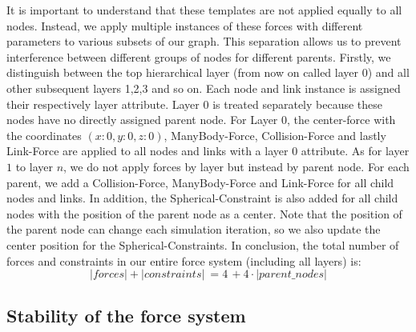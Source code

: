 It is important to understand that these templates are not applied equally to all nodes. Instead, we apply multiple instances of these forces with different parameters to various subsets of our graph. 
This separation allows us to prevent interference between different groups of nodes for different parents.
Firstly, we distinguish between the top hierarchical layer (from now on called layer $0$) and all other subsequent layers 1,2,3 and so on. Each node and link instance is assigned their respectively layer attribute. Layer $0$ is treated separately because these nodes have no directly assigned parent node. 
For Layer $0$, the center-force with the coordinates $(x:0,y:0,z:0)$, ManyBody-Force, Collision-Force and lastly Link-Force are applied to all nodes and links with a layer $0$ attribute. 
As for layer $1$ to layer $n$, we do not apply forces by layer but instead by parent node. For each parent, we add a Collision-Force, ManyBody-Force and Link-Force for all child nodes and links. In addition, the Spherical-Constraint is also added for all child nodes with the position of the parent node as a center. Note that the position of the parent node can change each simulation iteration, so we also update the center position for the Spherical-Constraints.
In conclusion, the total number of forces and constraints in our entire force system (including all layers) is: 
\begin{equation}
    |forces| + |constraints| \: = 4 \, + 4 \cdot |parent\_nodes|
\end{equation}

\subsection{Stability of the force system}

